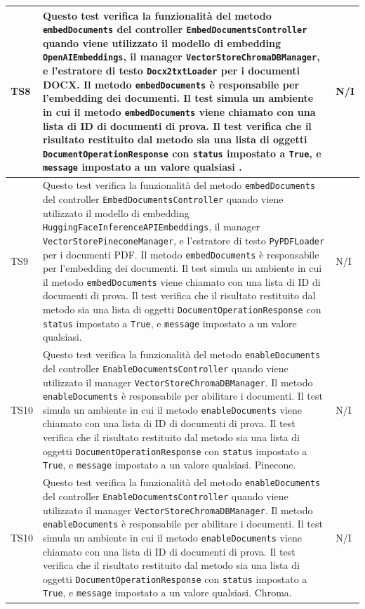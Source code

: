 \documentclass[10pt, a4paper]{article}
\begin{document}
\begin{xltabular}{\textwidth}{p{0.12\textwidth}|X|p{0.12\textwidth}}
    \hline
    TS8 & Questo test verifica la funzionalità del metodo \texttt{embedDocuments} del controller \texttt{EmbedDocumentsController} quando viene utilizzato il modello di embedding \texttt{OpenAIEmbeddings}, il manager \texttt{VectorStoreChromaDBManager}, e l'estratore di testo \texttt{Docx2txtLoader} per i documenti DOCX. Il metodo \texttt{embedDocuments} è responsabile per l'embedding dei documenti. Il test simula un ambiente in cui il metodo \texttt{embedDocuments} viene chiamato con una lista di ID di documenti di prova. Il test verifica che il risultato restituito dal metodo sia una lista di oggetti \texttt{DocumentOperationResponse} con \texttt{status} impostato a \texttt{True}, e \texttt{message} impostato a un valore qualsiasi . & N/I \\
    \hline
    TS9 & Questo test verifica la funzionalità del metodo \texttt{embedDocuments} del controller \texttt{EmbedDocumentsController} quando viene utilizzato il modello di embedding \texttt{HuggingFaceInferenceAPIEmbeddings}, il manager \texttt{VectorStorePineconeManager}, e l'estratore di testo \texttt{PyPDFLoader} per i documenti PDF. Il metodo \texttt{embedDocuments} è responsabile per l'embedding dei documenti. Il test simula un ambiente in cui il metodo \texttt{embedDocuments} viene chiamato con una lista di ID di documenti di prova. Il test verifica che il risultato restituito dal metodo sia una lista di oggetti \texttt{DocumentOperationResponse} con \texttt{status} impostato a \texttt{True}, e \texttt{message} impostato a un valore qualsiasi. & N/I \\
    \hline
    TS10 & Questo test verifica la funzionalità del metodo \texttt{enableDocuments} del controller \texttt{EnableDocumentsController} quando viene utilizzato il manager \texttt{VectorStoreChromaDBManager}. Il metodo \texttt{enableDocuments} è responsabile per abilitare i documenti. Il test simula un ambiente in cui il metodo \texttt{enableDocuments} viene chiamato con una lista di ID di documenti di prova. Il test verifica che il risultato restituito dal metodo sia una lista di oggetti \texttt{DocumentOperationResponse} con \texttt{status} impostato a \texttt{True}, e \texttt{message} impostato a un valore qualsiasi. Pinecone. & N/I \\
    \hline
    TS10 & Questo test verifica la funzionalità del metodo \texttt{enableDocuments} del controller \texttt{EnableDocumentsController} quando viene utilizzato il manager \texttt{VectorStoreChromaDBManager}. Il metodo \texttt{enableDocuments} è responsabile per abilitare i documenti. Il test simula un ambiente in cui il metodo \texttt{enableDocuments} viene chiamato con una lista di ID di documenti di prova. Il test verifica che il risultato restituito dal metodo sia una lista di oggetti \texttt{DocumentOperationResponse} con \texttt{status} impostato a \texttt{True}, e \texttt{message} impostato a un valore qualsiasi. Chroma. & N/I \\

\end{xltabular}
\end{document}

